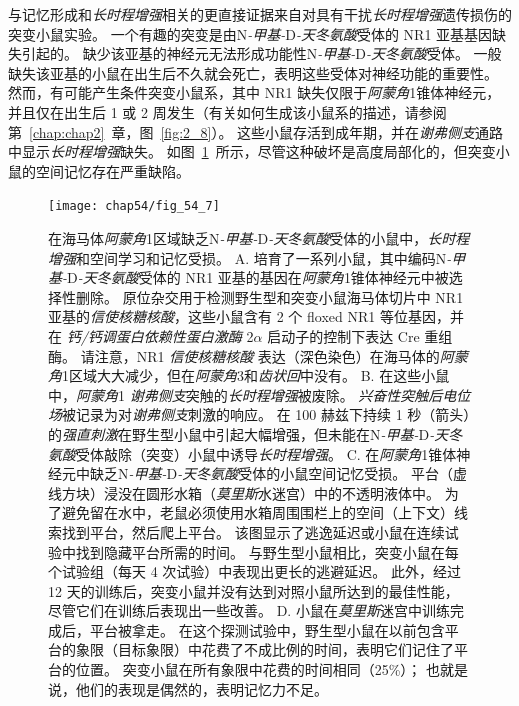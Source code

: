 与记忆形成和\textit{长时程增强}相关的更直接证据来自对具有干扰\textit{长时程增强}遗传损伤的突变小鼠实验。
一个有趣的突变是由N\textit{-甲基-}D\textit{-天冬氨酸}受体的 NR1 亚基基因缺失引起的。
缺少该亚基的神经元无法形成功能性N\textit{-甲基-}D\textit{-天冬氨酸}受体。
一般缺失该亚基的小鼠在出生后不久就会死亡，表明这些受体对神经功能的重要性。
然而，有可能产生条件突变小鼠系，其中 NR1 缺失仅限于\textit{阿蒙角}1锥体神经元，并且仅在出生后 1 或 2 周发生（有关如何生成该小鼠系的描述，请参阅第~\ref{chap:chap2}~章，图~\ref{fig:2_8}）。
这些小鼠存活到成年期，并在\textit{谢弗侧支}通路中显示\textit{长时程增强}缺失。
如图~\ref{fig:54_7}~所示，尽管这种破坏是高度局部化的，但突变小鼠的空间记忆存在严重缺陷。


\begin{figure}[htbp]
	\centering
	\texttt{[image: chap54/fig\_54\_7]}
	\caption{在海马体\textit{阿蒙角}1区域缺乏N\textit{-甲基-}D\textit{-天冬氨酸}受体的小鼠中，\textit{长时程增强}和空间学习和记忆受损。
		A. 培育了一系列小鼠，其中编码N\textit{-甲基-}D\textit{-天冬氨酸}受体的 NR1 亚基的基因在\textit{阿蒙角}1锥体神经元中被选择性删除。
		原位杂交用于检测野生型和突变小鼠海马体切片中 NR1 亚基的\textit{信使核糖核酸}，这些小鼠含有 2 个 floxed NR1 等位基因，并在 \textit{钙/钙调蛋白依赖性蛋白激酶} 2$\alpha$ 启动子的控制下表达 Cre 重组酶。
		请注意，NR1 \textit{信使核糖核酸} 表达（深色染色）在海马体的\textit{阿蒙角}1区域大大减少，但在\textit{阿蒙角}3和\textit{齿状回}中没有。
		B. 在这些小鼠中，\textit{阿蒙角}1 \textit{谢弗侧支}突触的\textit{长时程增强}被废除。
		\textit{兴奋性突触后电位场}被记录为对\textit{谢弗侧支}刺激的响应。
		在 100 赫兹下持续 1 秒（箭头）的\textit{强直刺激}在野生型小鼠中引起大幅增强，但未能在N\textit{-甲基-}D\textit{-天冬氨酸}受体敲除（突变）小鼠中诱导\textit{长时程增强}。
		C. 在\textit{阿蒙角}1锥体神经元中缺乏N\textit{-甲基-}D\textit{-天冬氨酸}受体的小鼠空间记忆受损。
		平台（虚线方块）浸没在圆形水箱（\textit{莫里斯}水迷宫）中的不透明液体中。
		为了避免留在水中，老鼠必须使用水箱周围围栏上的空间（上下文）线索找到平台，然后爬上平台。
		该图显示了逃逸延迟或小鼠在连续试验中找到隐藏平台所需的时间。
		与野生型小鼠相比，突变小鼠在每个试验组（每天 4 次试验）中表现出更长的逃避延迟。
		此外，经过 12 天的训练后，突变小鼠并没有达到对照小鼠所达到的最佳性能，尽管它们在训练后表现出一些改善。
		D. 小鼠在\textit{莫里斯}迷宫中训练完成后，平台被拿走。
		在这个探测试验中，野生型小鼠在以前包含平台的象限（目标象限）中花费了不成比例的时间，表明它们记住了平台的位置。
		突变小鼠在所有象限中花费的时间相同（25\%）；
		也就是说，他们的表现是偶然的，表明记忆力不足。}
	\label{fig:54_7}
\end{figure}


